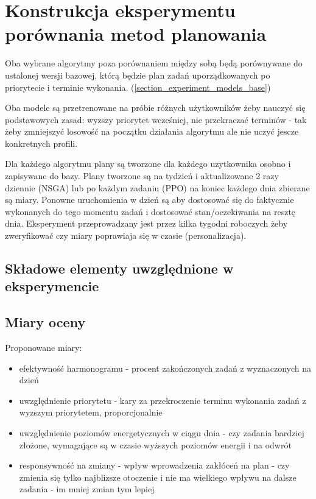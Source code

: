 \section{Konstrukcja eksperymentu porównania metod planowania}\label{section_experiment}
Oba wybrane algorytmy poza porównaniem między sobą będą porównywane do ustalonej wersji bazowej, którą będzie plan zadań uporządkowanych po priorytecie i terminie wykonania. (\ref{section_experiment_models_base})

Oba modele są przetrenowane na próbie różnych użytkowników żeby nauczyć się podstawowych zasad: wyzszy priorytet wcześniej, nie przekraczać terminów - tak żeby zmniejszyć losowość na początku działania algorytmu ale nie uczyć jescze konkretnych profili.

Dla każdego algorytmu plany są tworzone dla każdego uzytkownika osobno i zapisywane do bazy. Plany tworzone są na tydzień i aktualizowane 2 razy dziennie (NSGA) lub po każdym zadaniu (PPO) na koniec każdego dnia zbierane są miary. Ponowne uruchomienia w dzień są aby dostosować się do faktycznie wykonanych do tego momentu zadań i dostosować stan/oczekiwania na resztę dnia. Eksperyment przeprowadzany jest przez kilka tygodni roboczych żeby zweryfikować czy miary poprawiaja się w czasie (personalizacja).

\subsection{Składowe elementy uwzględnione w eksperymencie}\label{section_experiment_elements}

\subsection{Miary oceny}\label{section_experiment_measures}
Proponowane miary:
\begin{itemize}
    \item efektywność harmonogramu - procent zakończonych zadań z wyznaczonych na dzień
    \item uwzględnienie priorytetu - kary za przekroczenie terminu wykonania zadań z wyzszym priorytetem, proporcjonalnie
    \item uwzględnienie poziomów energetycznych w ciągu dnia - czy zadania bardziej złożone, wymagające są w czasie wyższych poziomów energii i na odwrót
    \item responsywność na zmiany - wpływ wprowadzenia zakłóceń na plan - czy zmienia się tylko najblizsze otoczenie i nie ma wielkiego wpływu na dalsze zadania - im mniej zmian tym lepiej
\end{itemize}

